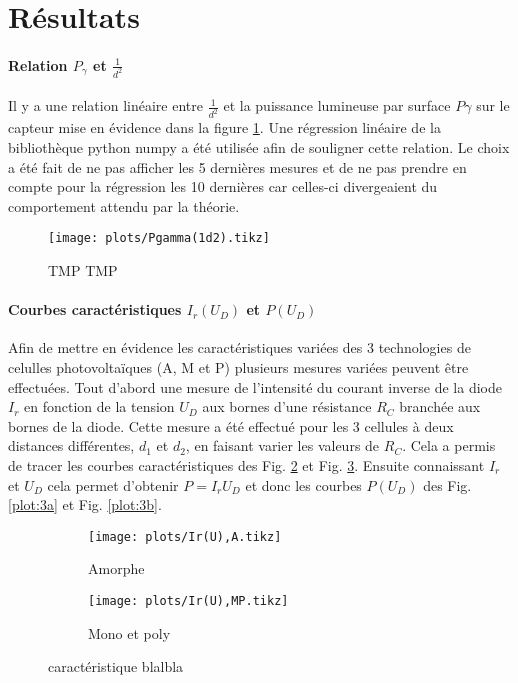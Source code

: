 \section{Résultats}

\paragraph*{Relation \(P_\gamma\) et \(\frac{1}{d^2}\)}
Il y a une relation linéaire entre \(\frac{1}{d^2}\) et la puissance lumineuse par surface \(P\gamma\) sur le capteur mise en évidence dans la figure \ref{plot:1}. Une régression linéaire de la bibliothèque python numpy a été utilisée afin de souligner cette relation.
Le choix a été fait de ne pas afficher les 5 dernières mesures et de ne pas prendre en compte pour la régression les 10 dernières car celles-ci divergeaient du comportement attendu par la théorie.

\begin{figure}[h]
    \centering
    \texttt{[image: plots/Pgamma(1d2).tikz]}
    \caption{TMP TMP}
    \label{plot:1}
\end{figure}

\paragraph*{Courbes caractéristiques \(I_r(U_D)\) et \(P(U_D)\)}
Afin de mettre en évidence les caractéristiques variées des 3 technologies de celulles photovoltaïques (A, M et P) plusieurs mesures variées peuvent être effectuées.
Tout d'abord une mesure de l'intensité du courant inverse de la diode \(I_r\) en fonction de la tension \(U_D\) aux bornes d'une résistance \(R_C\) branchée aux bornes de la diode.
Cette mesure a été effectué pour les 3 cellules à deux distances différentes, \(d_1\) et \(d_2\), en faisant varier les valeurs de \(R_C\). Cela a permis de tracer les courbes caractéristiques des Fig. \ref{plot:2a} et Fig. \ref{plot:2b}.
Ensuite connaissant \(I_r\) et \(U_D\) cela permet d'obtenir \(P = I_r U_D\) et donc les courbes \(P(U_D)\) des Fig. \ref{plot:3a} et Fig. \ref{plot:3b}.

\begin{figure}
    \centering
    \begin{subfigure}[c]{0.4\linewidth}
        \centering
        \texttt{[image: plots/Ir(U),A.tikz]}
        \caption{Amorphe}
        \label{plot:2a}
    \end{subfigure}
    \begin{subfigure}[c]{0.4\linewidth}
        \centering
        \texttt{[image: plots/Ir(U),MP.tikz]}
        \caption{Mono et poly}
        \label{plot:2b}
    \end{subfigure}
    \caption{caractéristique blalbla}
    \label{plot:2}
\end{figure}

